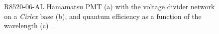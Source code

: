 \begin{figure}[!h]
\centering
{}
\caption[R8520-06-AL Hamamatsu PMT with the voltage divider network on a {\it Cirlex} base, and its quantum efficiency as a function of the wavelength]{R8520-06-AL Hamamatsu PMT (a) with the voltage divider network on a {\it Cirlex} base (b), and quantum efficiency as a function of the wavelength (c)~\cite{PMTmassModel}.}
\label{figPMT}
\end{figure}


